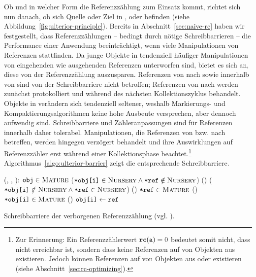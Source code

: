 Ob und in welcher Form die Referenzzählung zum Einsatz kommt, richtet sich nun danach, ob sich Quelle oder Ziel in \Roots, \Nursery oder \Mature befinden (siehe Abbildung~\ref{fig:ulterior-principle}).
Bereits in Abschnitt~\ref{sec:naive-rc} haben wir festgestellt, dass Referenzzählungen -- bedingt durch nötige Schreibbarrieren -- die Performance einer Anwendung beeinträchtigt, wenn viele Manipulationen von Referenzen stattfinden.
Da junge Objekte in \Nursery tendenziell häufiger Manipulationen von eingehenden wie ausgehenden Referenzen unterworfen sind, bietet es sich an, diese von der Referenzzählung auszusparen.
Referenzen von \Roots nach \Nursery sowie innerhalb von \Nursery sind von der Schreibbarriere nicht betroffen; Referenzen von \Mature nach \Nursery werden zunächst protokolliert und während des nächsten Kollektionszyklus behandelt.
Objekte in \Mature verändern sich tendenziell seltener, weshalb Markierungs- und Kompaktierungsalgorithmen keine hohe Ausbeute versprechen, aber dennoch aufwendig sind.
Schreibbarriere und Zähleranpassungen sind für Referenzen innerhalb \Mature daher tolerabel.
Manipulationen, die Referenzen von \Roots bzw. \Nursery nach \Mature betreffen, werden hingegen verzögert behandelt und ihre Auswirklungen auf Referenzzähler erst während einer Kollektionsphase beachtet.\footnote{Zur Erinnerung: Ein Referenzzählerwert $\texttt{rc}(\texttt{a}) = 0$ bedeutet somit nicht, dass  nicht erreichbar ist, sondern dass keine Referenzen auf  von Objekten aus \Mature existieren. Jedoch können Referenzen auf  von Objekten aus \Roots oder \Nursery existieren (siehe Abschnitt~\ref{sec:rc-optimizing}).}
Algorithmus~\ref{algo:ulterior-barrier} zeigt die entsprechende Schreibbarriere.

\begin{algorithm}[h]
\begin{algorithmic}[1]
	\State {}(, , ):
	\State \quad \IF $\texttt{obj} \in \textsc{Mature}$
	\State \quad \quad \Atomic
	\State \quad \quad \quad \IF ($\texttt{*obj[i]} \in \textsc{Nursery} \wedge \texttt{*ref} \notin \textsc{Nursery}$)	
	\State \quad \quad \quad \quad {}()	
	\State \quad \quad \quad \ELSE \IF ($\texttt{*obj[i]} \notin \textsc{Nursery} \wedge \texttt{*ref} \in \textsc{Nursery}$)
	\State \quad \quad \quad \quad {}()	
	\State \quad \quad \quad \IF $\texttt{*ref} \in \textsc{Mature}$		
	\State \quad \quad \quad \quad {}()
	\State \quad \quad \quad \IF $\texttt{*obj[i]} \in \textsc{Mature}$
	\State \quad \quad \quad \quad {}()
	\State \quad $\texttt{obj[i]} \gets \texttt{ref}$
\end{algorithmic}
\caption[Schreibbarriere der verborgenen Referenzzählung]{Schreibbarriere der verborgenen Referenzzählung (vgl. \cite[S. 346ff]{blackburn2003}).}
\label{algo:ulterior-barrier}
\end{algorithm}

